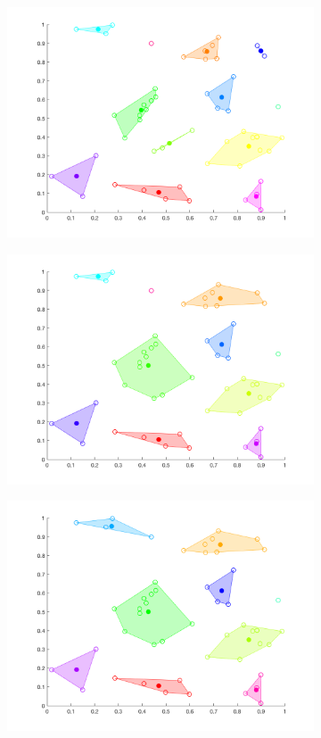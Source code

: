 \documentclass[12pt]{article}
\begin{document}
\begin{figure}[t!]
\begin{subfigure}[b]{0.3\textwidth}
        \includegraphics[width=\textwidth]{ha_8}
    \end{subfigure}
    \begin{subfigure}[b]{0.3\textwidth}
        \includegraphics[width=\textwidth]{ha_9}
    \end{subfigure}
    \begin{subfigure}[b]{0.3\textwidth}
        \includegraphics[width=\textwidth]{ha_10}

\end{subfigure}
\end{figure}
\end{document}
